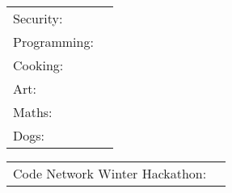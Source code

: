 \documentclass[]{awesome-cv}
\begin{document}
\begin{cventries}
	\cventry
	{}
	{\def\arraystretch{1.15}{\begin{tabular}{ l l }
		Security:  & {\skill{ Hardware, Networks, Binary}} \\
		Programming:  & {\skill{ Firmware development, python automation}} \\
		Cooking:  & {\skill{ Everything}} \\
		Art:  & {\skill{ Painting, Drawing, Portraiture, Photography}} \\
		Maths:  & {\skill{ Shader Maths, Algorithms, Lossless compression}} \\
		Dogs:  & {\skill{ Dogs}} \\
		\end{tabular}}}
	{}
	{}
	{}
	\vspace{-7mm}
\end{cventries}

\begin{cventries}
	\cventry
	{}
	{\def\arraystretch{1.15}{\begin{tabular}{ l l }
		Code Network Winter Hackathon:  & {\skill{ Individual prize}} \\
		\end{tabular}}}
	{}
	{}
	{}
\end{cventries}
\vspace{-7mm}

\ 
\end{document}
